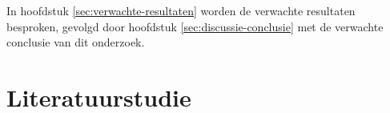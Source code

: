In hoofdstuk \ref{sec:verwachte-resultaten} worden de verwachte resultaten besproken, gevolgd door 
hoofdstuk \ref{sec:discussie-conclusie} met de verwachte conclusie van dit onderzoek.

\bigskip



\section{Literatuurstudie}%
\label{sec:literatuurstudie}







